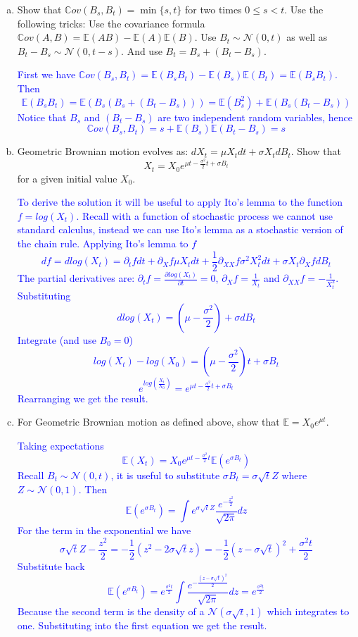 \documentclass[11pt]{extarticle}
\theoremstyle{plain}
\theoremstyle{definition}
\begin{document}
\begin{enumerate}[(a)]
\item Show that $\mathbb Cov(B_s, B_t) = \min\{s, t\}$ for two times $0 \leq s < t$. Use the following tricks: Use the covariance formula $\mathbb Cov(A, B) = \mathbb E (AB) - \mathbb E(A) \mathbb E(B)$. Use $B_t \sim \mathcal N(0, t)$ as well as $B_t - B_s \sim \mathcal N(0, t-s)$. And use $B_t = B_s + (B_t - B_s)$.

\textcolor{blue}{First we have  $\mathbb Cov(B_s, B_t) = \mathbb E (B_sB_t) - \mathbb E(B_s) \mathbb E(B_t) = \mathbb E (B_sB_t)  $. Then $$ \mathbb E (B_sB_t) =  \mathbb E (B_s(B_s+(B_t-B_s)))=\mathbb E (B_s^2)+ \mathbb E (B_s(B_t-B_s))$$ Notice that $B_s$ and $(B_t-B_s)$ are two independent random variables, hence $$\mathbb Cov(B_s, B_t) = s+\mathbb E (B_s) \mathbb E(B_t-B_s)=s$$}

\item Geometric Brownian motion evolves as: $dX_t = \mu X_t dt + \sigma X_t dB_t$. Show that
\begin{equation*}
	X_t = X_0 e^{\mu t - \frac{\sigma^2}{2} t + \sigma B_t}
\end{equation*}
for a given initial value $X_0$.

\textcolor{blue}{To derive the solution it will be useful to apply Ito's lemma to the function $f=log(X_t)$. Recall with a function of stochastic process we cannot use standard calculus, instead we can use Ito's lemma as a stochastic version of the chain rule. Applying Ito's lemma to $f$ $$df = dlog(X_t)= \partial_t f dt +\partial_X f \mu X_t dt+\frac{1}{2}\partial_{XX}f \sigma^2 X_t^2dt +\sigma X_t \partial_X f dB_t$$ The partial derivatives are: $\partial_t f = \frac{\partial log(X_t)}{\partial t}=0$, $\partial_X f = \frac{1}{X_t}$ and $\partial_{XX}f  = -\frac{1}{X_t^2}$. Substituting $$dlog(X_t) = (\mu - \frac{\sigma^2}{2})+\sigma dB_t$$ Integrate (and use $B_0=0$) $$log(X_t)-log(X_0)=(\mu - \frac{\sigma^2}{2})t+\sigma B_t$$ $$e^{log(\frac{X_t}{X_0})}=e^{\mu t - \frac{\sigma^2}{2} t + \sigma B_t}$$ Rearranging we get the result.}

\item For Geometric Brownian motion as defined above, show that $\mathbb E = X_0 e^{\mu t}$.

\textcolor{blue}{Taking expectations $$ \mathbb E (X_t)=  X_0 e^{\mu t-\frac{\sigma^2}{2}t}\mathbb E (e^{\sigma B_t})$$ Recall $ B_t \sim \mathcal N(0, t)$, it is useful to substitute $\sigma B_t = \sigma \sqrt t Z$ where  $Z \sim \mathcal N(0, 1)$. Then $$\mathbb E (e^{\sigma B_t}) = \int e^{\sigma \sqrt t Z}\frac{e^{-\frac{z^2}{2}}}{\sqrt{2\pi}}dz$$ For the term in the exponential we have $$\sigma \sqrt t Z-\frac{z^2}{2}=-\frac{1}{2}(z^2-2\sigma \sqrt{t}z) = -\frac{1}{2}(z -\sigma \sqrt{t})^2 +\frac{\sigma^2 t}{2} $$ Substitute back $$\mathbb E (e^{\sigma B_t}) = e^{\frac{\sigma^2 t}{2}}\int \frac{e^{-\frac{(z-\sigma \sqrt{t})^2}{2}}}{\sqrt{2\pi}}dz=e^{\frac{\sigma^2 t}{2}}$$ Because the second term is the density of a $\mathcal N (\sigma \sqrt t,1)$ which integrates to one. Substituting into the first equation we get the result.}


\end{enumerate}
\end{document}

